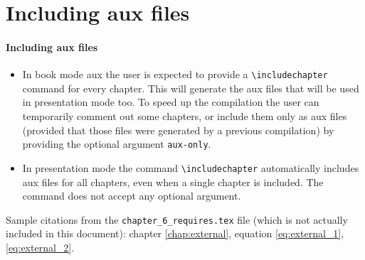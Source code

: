 \setcounter{chapter}{5}
\chapter{Including aux files}
\label{chap:including_aux_files}

\begin{frame}[fragile]
\frametitle{Including aux files}

\begin{itemize}
\item In book mode aux the user is expected to provide a \verb|\includechapter| command for every chapter. This will generate the aux files that will be used in presentation mode too. To speed up the compilation the user can temporarily comment out some chapters, or include them only as aux files (provided that those files were generated by a previous compilation) by providing the optional argument \verb|aux-only|.
\item In presentation mode the command \verb|\includechapter| automatically includes aux files for all chapters, even when a single chapter is included. The command does not accept any optional argument.
\end{itemize}

Sample citations from the \verb|chapter_6_requires.tex| file (which is not actually included in this document): chapter \ref{chap:external}, equation \ref{eq:external_1}, \eqref{eq:external_2}.
\end{frame}
